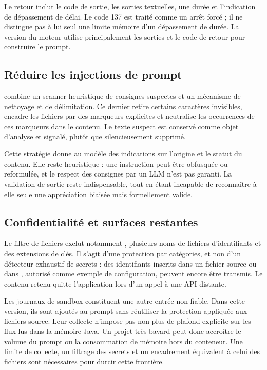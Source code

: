 Le retour inclut le code de sortie, les sorties textuelles, une durée et l'indication de dépassement de délai. Le code 137 est traité comme un arrêt forcé ; il ne distingue pas à lui seul une limite mémoire d'un dépassement de durée. La version du moteur utilise principalement les sorties et le code de retour pour construire le prompt.

\subsection{Réduire les injections de prompt}
 combine un scanner heuristique de consignes suspectes et un mécanisme de nettoyage et de délimitation. Ce dernier retire certains caractères invisibles, encadre les fichiers par des marqueurs explicites et neutralise les occurrences de ces marqueurs dans le contenu. Le texte suspect est conservé comme objet d'analyse et signalé, plutôt que silencieusement supprimé.

Cette stratégie donne au modèle des indications sur l'origine et le statut du contenu. Elle reste heuristique : une instruction peut être obfusquée ou reformulée, et le respect des consignes par un LLM n'est pas garanti. La validation de sortie reste indispensable, tout en étant incapable de reconnaître à elle seule une appréciation biaisée mais formellement valide.

\subsection{Confidentialité et surfaces restantes}
Le filtre de fichiers exclut notamment , plusieurs noms de fichiers d'identifiants et des extensions de clés. Il s'agit d'une protection par catégories, et non d'un détecteur exhaustif de secrets : des identifiants inscrits dans un fichier source ou dans , autorisé comme exemple de configuration, peuvent encore être transmis. Le contenu retenu quitte l'application lors d'un appel à une API distante.

Les journaux de sandbox constituent une autre entrée non fiable. Dans cette version, ils sont ajoutés au prompt sans réutiliser la protection appliquée aux fichiers source. Leur collecte n'impose pas non plus de plafond explicite sur les flux lus dans la mémoire Java. Un projet très bavard peut donc accroître le volume du prompt ou la consommation de mémoire hors du conteneur. Une limite de collecte, un filtrage des secrets et un encadrement équivalent à celui des fichiers sont nécessaires pour durcir cette frontière.

